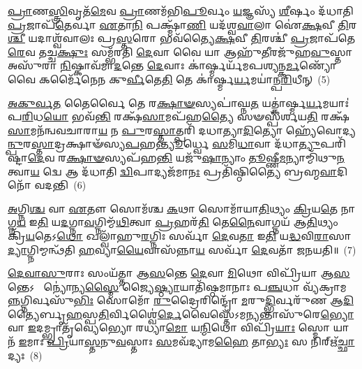 \-\ul{𑌪𑍍𑌰𑌾}\-𑌣\-\ul{𑌸𑍍𑌤𑍍𑌰𑌿}\-𑌵𑍃𑌤᳴\-\ul{𑌮𑍇}\-𑌵 \ul{𑌪𑍍𑌰𑌾}\-𑌣𑌮᳴𑌭𑌿\-\ul{𑌪𑍂}\-𑌰𑍍𑌵𑌂 \ul{𑌯}\-𑌜𑍍𑌞𑌸𑍍𑌯᳴ \ul{𑌶𑍀}\-𑌰𑍍\mbox{}𑌷𑌂 𑌦᳴𑌧𑌾𑌤𑌿 \ul{𑌪𑍍𑌰}\-𑌜𑌾𑌪᳴\-\ul{𑌤𑍇}\-𑌰𑍍𑌵𑌾 \ul{𑌏}\-𑌤𑌾\-\ul{𑌨𑌿} 𑌪𑌕𑍍𑌷𑍍𑌮𑌾᳴\-\ul{𑌣𑌿} 𑌯𑌦᳴𑌶𑍍𑌵\-\ul{𑌵𑌾}\-𑌲𑌾 𑌐॑\-\ul{𑌕𑍍𑌷}\-𑌵𑍀 \ul{𑌤𑌿}\-𑌰\-\ul{𑌶𑍍𑌚𑍀} 𑌯𑌦𑌾𑌶𑍍𑌵᳴𑌵𑌾𑌲𑌃 𑌪𑍍𑌰\-\ul{𑌸𑍍𑌤}\-𑌰𑍋 𑌭𑌵᳴𑌤𑍍𑌯𑍈\-\ul{𑌕𑍍𑌷}\-𑌵𑍀 \ul{𑌤𑌿}\-𑌰𑌶𑍍𑌚𑍀॑ \ul{𑌪𑍍𑌰}\-𑌜𑌾𑌪᳴𑌤𑍇\-\ul{𑌰𑍇}\-𑌵 𑌤𑌚𑍍𑌚\-\ul{𑌕𑍍𑌷𑍁𑌃} 𑌸𑌮𑍍𑌭᳴𑌰𑌤𑌿 \ul{𑌦𑍇}\-𑌵𑌾 𑌵𑍈 𑌯𑌾 𑌆𑌹𑍁᳴\-\ul{𑌤𑍀}\-𑌰𑌜𑍁᳴𑌹\-\ul{𑌵𑍁}\-𑌸𑍍𑌤𑌾 𑌅𑌸𑍁᳴𑌰𑌾 \ul{𑌨𑌿}\-𑌷𑍍𑌕𑌾𑌵᳴𑌮𑌾\-\ul{𑌦}\-𑌨𑍍𑌤𑍇 \ul{𑌦𑍇}\-𑌵𑌾𑌃 𑌕𑌾॑𑌰𑍍\mbox{}\-\ul{𑌷𑍍𑌮}\-𑌰𑍍𑌯᳴𑌮𑌪𑌶𑍍𑌯𑌨𑍍𑌕\-\ul{𑌰𑍍𑌮}\-𑌣𑍍𑌯𑍋᳴ 𑌵𑍈 𑌕𑌰𑍍𑌮𑍈᳴𑌨𑍇𑌨 𑌕𑍁\-\ul{𑌰𑍍𑌵𑍀}\-𑌤𑍇\-\ul{𑌤𑌿} 𑌤𑍇 𑌕𑌾॑𑌰𑍍𑌷𑍍𑌮\-\ul{𑌰𑍍𑌯}\-𑌮𑌯𑌾॑𑌨𑍍𑌪\-\ul{𑌰𑌿}\-𑌧𑍀𑌨𑍍~(5)

\-\ul{𑌅}\-\-\ul{𑌕𑍁}\-\-\ul{𑌰𑍍𑌵}\-\-\ul{𑌤} 𑌤𑍈𑌰𑍍𑌵𑍈 𑌤𑍇 𑌰\-\ul{𑌕𑍍𑌷𑌾}\-\-\ul{𑍟}\-𑌸𑍍𑌯𑌪𑌾॑𑌘𑍍𑌨\-\ul{𑌤} 𑌯𑌤𑍍𑌕𑌾॑𑌰𑍍𑌷𑍍𑌮\-\ul{𑌰𑍍𑌯}\-𑌮𑌯𑌾𑌃॑ 𑌪\-\ul{𑌰𑌿}\-𑌧\-\ul{𑌯𑍋} 𑌭𑌵᳴\-\ul{𑌨𑍍𑌤𑌿} 𑌰𑌕𑍍𑌷᳴\-\ul{𑌸𑌾}\-𑌮𑌪᳴𑌹\-\ul{𑌤𑍍𑌯𑍈} 𑌸𑍟𑌸𑍍𑌪᳴𑌰𑍍𑌶𑌯\-\ul{𑌤𑌿} 𑌰𑌕𑍍𑌷᳴\-\ul{𑌸𑌾}\-𑌮𑌨᳴𑌨𑍍𑌵𑌵𑌚𑌾𑌰𑌾\-\ul{𑌯} 𑌨 \ul{𑌪𑍁}\-𑌰\-\ul{𑌸𑍍𑌤𑌾}\-𑌤𑍍𑌪𑌰𑌿᳴ 𑌦𑌧𑌾𑌤𑍍𑌯𑌾\-\ul{𑌦𑌿}\-𑌤𑍍𑌯𑍋 𑌹𑍍𑌯𑍇᳴𑌵𑍋𑌦𑍍𑌯\-\ul{𑌨𑍍𑌪𑍁}\-𑌰\-\ul{𑌸𑍍𑌤𑌾}\-𑌦𑍍𑌰𑌕𑍍𑌷𑌾𑍟᳴𑌸𑍍𑌯\-\ul{𑌪}\-𑌹\-\ul{𑌨𑍍𑌤𑍍𑌯𑍂}\-𑌰𑍍𑌧𑍍𑌵𑍇 \ul{𑌸}\-𑌮𑌿\-\ul{𑌧𑌾}\-𑌵𑌾 𑌦᳴𑌧𑌾\-\ul{𑌤𑍍𑌯𑍁}\-𑌪𑌰𑌿᳴𑌷𑍍𑌟𑌾\-\ul{𑌦𑍇}\-𑌵 𑌰\-\ul{𑌕𑍍𑌷𑌾}\-\-\ul{𑍟}\-𑌸𑍍𑌯𑌪᳴𑌹\-\ul{𑌨𑍍𑌤𑌿} 𑌯𑌜𑍁᳴\-\ul{𑌷𑌾}\-𑌨𑍍𑌯𑌾𑌂 \ul{𑌤𑍂}\-𑌷𑍍𑌣𑍀\-\ul{𑌮}\-𑌨𑍍𑌯𑌾𑌮𑍍𑌮𑌿᳴𑌥𑍁\-\ul{𑌨}\-𑌤𑍍𑌵𑌾\-\ul{𑌯} 𑌦𑍍𑌵𑍇 𑌆 𑌦᳴𑌧𑌾𑌤𑌿 \ul{𑌦𑍍𑌵𑌿}\-𑌪𑌾𑌦𑍍𑌯𑌜᳴𑌮𑌾\-\ul{𑌨𑌃} 𑌪𑍍𑌰𑌤𑌿᳴𑌷𑍍𑌠𑌿𑌤𑍍𑌯𑍈 𑌬𑍍𑌰𑌹𑍍𑌮\-\ul{𑌵𑌾}\-𑌦𑌿𑌨𑍋᳴ 𑌵𑌦𑌨𑍍𑌤𑌿~(6)

\-\ul{𑌅}\-𑌗𑍍𑌨𑌿\-\ul{𑌶𑍍𑌚} 𑌵𑌾 \ul{𑌏}\-𑌤𑍗 𑌸𑍋𑌮᳴𑌶𑍍𑌚 \ul{𑌕}\-𑌥𑌾 𑌸𑍋𑌮𑌾᳴𑌯𑌾\-\ul{𑌤𑌿}\-𑌥𑍍𑌯𑌂 \ul{𑌕𑍍𑌰𑌿}\-𑌯\-\ul{𑌤𑍇} 𑌨𑌾𑌗𑍍𑌨\-\ul{𑌯} 𑌇\-\ul{𑌤𑌿} 𑌯\-\ul{𑌦}\-𑌗𑍍𑌨𑌾\-\ul{𑌵}\-𑌗𑍍𑌨𑌿𑌮𑍍𑌮᳴\-\ul{𑌥𑌿}\-𑌤𑍍𑌵𑌾 \ul{𑌪𑍍𑌰}\-𑌹𑌰᳴\-\ul{𑌤𑌿} 𑌤𑍇\-\ul{𑌨𑍈}\-𑌵𑌾𑌗𑍍𑌨𑌯᳴ 𑌆\-\ul{𑌤𑌿}\-𑌥𑍍𑌯𑌂 𑌕𑍍𑌰𑌿᳴\-\ul{𑌯}\-𑌤𑍇\-𑌽\-\ul{𑌥𑍋} 𑌖𑌲𑍍𑌵𑌾᳴𑌹𑍁\-\ul{𑌰}\-𑌗𑍍𑌨𑌿𑌃 𑌸𑌰𑍍𑌵𑌾᳴ \ul{𑌦𑍇}\-𑌵\-\ul{𑌤𑌾} 𑌇\-\ul{𑌤𑌿} 𑌯\-\ul{𑌦𑍍𑌧}\-𑌵𑌿\-\ul{𑌰𑌾}\-𑌸𑌾\-\ul{𑌦𑍍𑌯𑌾}\-𑌗𑍍𑌨𑌿𑌮𑍍𑌮𑌨𑍍𑌥᳴𑌤𑌿 \ul{𑌹}\-𑌵𑍍𑌯𑌾\-\ul{𑌯𑍈}\-𑌵𑌾𑌸᳴𑌨𑍍𑌨𑌾\-\ul{𑌯} 𑌸𑌰𑍍𑌵𑌾᳴ \ul{𑌦𑍇}\-𑌵𑌤𑌾᳴ 𑌜𑌨𑌯𑌤𑌿॥~(7)

{\anuvakamend[{𑌪𑌤𑍍𑌨𑌿᳴𑌯𑌾 \ul{𑌏}\-𑌵 𑌜𑌗᳴\-\ul{𑌤𑍍𑌯𑌾} 𑌆 \ul{𑌤𑍍𑌰𑌿}\-𑌵𑍃𑌦𑍍𑌵𑍈 𑌪᳴\-\ul{𑌰𑌿}\-𑌧𑍀𑌨𑍍 𑌵᳴\-\ul{𑌦}\-𑌨𑍍𑌤𑍍𑌯𑍇𑌕᳴𑌚𑌤𑍍𑌵𑌾𑌰𑌿𑍞𑌶𑌚𑍍𑌚}]}%

\-\ul{𑌦𑍇}\-\-\ul{𑌵𑌾}\-\-\ul{𑌸𑍁}\-𑌰𑌾𑌃 𑌸𑌂𑌯᳴𑌤𑍍𑌤𑌾 𑌆\-\ul{𑌸}\-𑌨𑍍𑌤𑍇 \ul{𑌦𑍇}\-𑌵𑌾 \ul{𑌮𑌿}\-𑌥𑍋 𑌵𑌿𑌪𑍍𑌰𑌿᳴𑌯𑌾 𑌆\-\ul{𑌸}\-𑌨𑍍𑌤𑍇\-𑌽  𑌨𑍍𑌯𑍋॑𑌨𑍍𑌯\-\ul{𑌸𑍍𑌮𑍈} 𑌜𑍍𑌯𑍈\-\ul{𑌷𑍍𑌠𑍍𑌯𑌾}\-𑌯𑌾𑌤𑌿᳴𑌷𑍍𑌠𑌮𑌾𑌨𑌾𑌃 𑌪\-\ul{𑌞𑍍𑌚}\-𑌧𑌾 𑌵𑍍𑌯᳴𑌕𑍍𑌰𑌾𑌮\-\ul{𑌨𑍍𑌨}\-𑌗𑍍𑌨𑌿\-𑌰𑍍𑌵𑌸𑍁᳴\-\ul{𑌭𑌿𑌃} 𑌸𑍋𑌮𑍋᳴ \ul{𑌰𑍁}\-𑌦𑍍𑌰𑍈𑌰𑌿𑌨𑍍𑌦𑍍𑌰𑍋᳴ \ul{𑌮}\-𑌰𑍁\-\ul{𑌦𑍍𑌭𑌿}\-𑌰𑍍𑌵𑌰𑍁᳴𑌣 𑌆\-\ul{𑌦𑌿}\-𑌤𑍍𑌯𑍈𑌰𑍍𑌬𑍃\-\ul{𑌹}\-𑌸𑍍𑌪\-\ul{𑌤𑌿}\-𑌰𑍍𑌵𑌿𑌶𑍍𑌵𑍈॑\-\ul{𑌰𑍍𑌦𑍇}\-𑌵𑍈𑌸𑍍𑌤𑍇᳴\-𑌽𑌮\-\ul{𑌨𑍍𑌯}\-𑌨𑍍𑌤𑌾𑌸𑍁᳴𑌰𑍇\-\ul{𑌭𑍍𑌯𑍋} 𑌵𑌾 \ul{𑌇}\-𑌦𑌮𑍍𑌭𑍍𑌰𑌾𑌤𑍃᳴𑌵𑍍𑌯𑍇𑌭𑍍𑌯𑍋 𑌰𑌧𑍍𑌯𑌾\-\ul{𑌮𑍋} 𑌯\-\ul{𑌨𑍍𑌮𑌿}\-𑌥𑍋 𑌵𑌿𑌪𑍍𑌰𑌿᳴\-\ul{𑌯𑌾𑌃} 𑌸𑍍𑌮𑍋 𑌯𑌾 𑌨᳴ \ul{𑌇}\-𑌮𑌾𑌃 \ul{𑌪𑍍𑌰𑌿}\-𑌯𑌾\-\ul{𑌸𑍍𑌤}\-𑌨𑍁\-\ul{𑌵}\-𑌸𑍍𑌤𑌾𑌃 \ul{𑌸}\-𑌮𑌵᳴𑌦𑍍𑌯𑌾𑌮\-\ul{𑌹𑍈} 𑌤𑌾\-\ul{𑌭𑍍𑌯𑌃} 𑌸 𑌨𑌿𑌰𑍍\mbox{}𑌋᳴\-\ul{𑌚𑍍𑌛𑌾}\-𑌦𑍍𑌯𑌃~(8)

